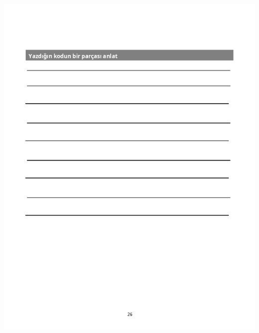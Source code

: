 \documentclass[12pt, a4paper]{article}
\begin{document}
\newpage
\includegraphics[width=1\linewidth]{cebirsplit-45.png}
\newpage
\end{document}
